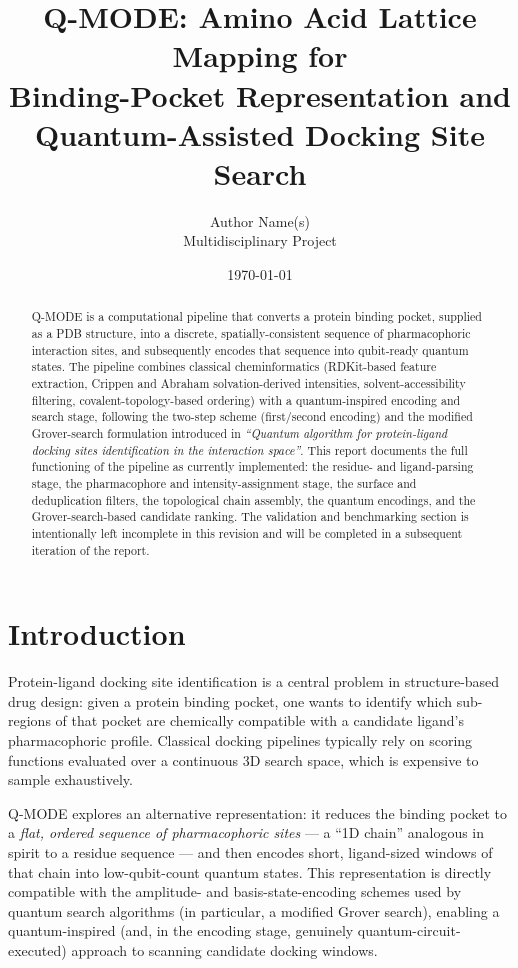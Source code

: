 \documentclass[11pt,a4paper]{article}
\title{\textbf{Q-MODE: Amino Acid Lattice Mapping for\\ Binding-Pocket Representation and \\ Quantum-Assisted Docking Site Search}}
\author{Author Name(s) \\ \small Multidisciplinary Project}
\date{\today}
\begin{document}
\maketitle

\begin{abstract}
Q-MODE is a computational pipeline that converts a protein binding pocket, supplied as a PDB structure, into a discrete, spatially-consistent sequence of pharmacophoric interaction sites, and subsequently encodes that sequence into qubit-ready quantum states. The pipeline combines classical cheminformatics (RDKit-based feature extraction, Crippen and Abraham solvation-derived intensities, solvent-accessibility filtering, covalent-topology-based ordering) with a quantum-inspired encoding and search stage, following the two-step scheme (first/second encoding) and the modified Grover-search formulation introduced in \emph{``Quantum algorithm for protein-ligand docking sites identification in the interaction space''}. This report documents the full functioning of the pipeline as currently implemented: the residue- and ligand-parsing stage, the pharmacophore and intensity-assignment stage, the surface and deduplication filters, the topological chain assembly, the quantum encodings, and the Grover-search-based candidate ranking. The validation and benchmarking section is intentionally left incomplete in this revision and will be completed in a subsequent iteration of the report.
\end{abstract}

\tableofcontents
\newpage

\section{Introduction}

Protein-ligand docking site identification is a central problem in structure-based drug design: given a protein binding pocket, one wants to identify which sub-regions of that pocket are chemically compatible with a candidate ligand's pharmacophoric profile. Classical docking pipelines typically rely on scoring functions evaluated over a continuous 3D search space, which is expensive to sample exhaustively.

Q-MODE explores an alternative representation: it reduces the binding pocket to a \emph{flat, ordered sequence of pharmacophoric sites} — a ``1D chain'' analogous in spirit to a residue sequence — and then encodes short, ligand-sized windows of that chain into low-qubit-count quantum states. This representation is directly compatible with the amplitude- and basis-state-encoding schemes used by quantum search algorithms (in particular, a modified Grover search), enabling a quantum-inspired (and, in the encoding stage, genuinely quantum-circuit-executed) approach to scanning candidate docking windows.
\end{document}

